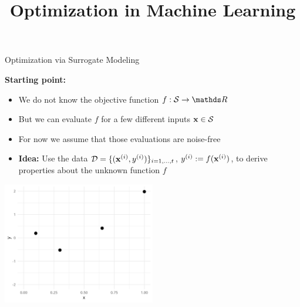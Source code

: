 \documentclass[11pt,compress,t,notes=noshow, xcolor=table]{beamer}
\title{Optimization in Machine Learning}
\date{}
\begin{document}

\begin{vbframe}{Optimization via Surrogate Modeling}

\textbf{Starting point:}
\begin{itemize}
\item We do not know the objective function $f: \mathcal{S} \to \R$
\item But we can evaluate $f$ for a few different inputs $\mathbf{x} \in \mathcal{S}$
\item For now we assume that those evaluations are noise-free

\item \textbf{Idea:}
  Use the data $\mathcal{D} = \{(\mathbf{x}^{(i)}, y^{(i)})\}_{i = 1, \ldots, t}$, $y^{(i)} := f(\mathbf{x}^{(i)})$, to derive properties about the unknown function $f$
\end{itemize}

\begin{center}
  \includegraphics[width = 0.5\textwidth]{figure_man/loop_0.png}
\end{center}

\end{vbframe}
\end{document}

